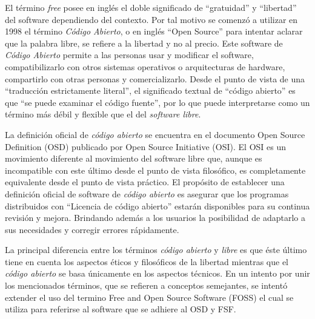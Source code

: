 El término \textit{free} posee en inglés el doble significado
de ``gratuidad'' y ``libertad'' del software dependiendo del
contexto. Por tal motivo se comenzó a utilizar
en 1998 el término \textit{Código Abierto}, o en inglés ``Open
Source'' para intentar aclarar que la palabra libre, se refiere a la libertad y no al precio. Este software de \textit{Código Abierto} permite a las personas usar y modificar el software, compatibilizarlo con otros sistemas operativos o arquitecturas de hardware, compartirlo con otras personas y comercializarlo.
Desde el punto de vista de una ``traducción
estrictamente literal'', el significado textual de ``código abierto''
es que ``se puede examinar el código fuente'', por lo que puede
interpretarse como un término más débil y flexible que el del
\textit{software libre}. 

La definición oficial de \textit{código abierto} se encuentra en el
documento Open Source Definition (OSD) publicado por Open
Source Initiative (OSI). El OSI es un movimiento diferente al
movimiento del software libre que, aunque es incompatible con este
último desde el punto de vista filosófico, es completamente
equivalente desde el punto de vista práctico. El propósito de
establecer una definición oficial de software de \textit{código
  abierto} es asegurar que los programas distribuidos con ``Licencia
de código abierto'' estarán disponibles para su continua revisión y
mejora. Brindando además a los usuarios la posibilidad de adaptarlo a
sus necesidades y corregir errores rápidamente.

La principal diferencia entre los términos \textit{código abierto} y
\textit{libre} es que éste último tiene en cuenta los aspectos éticos
y filosóficos de la libertad mientras que el \textit{código abierto}
se basa únicamente en los aspectos técnicos. En un intento por unir
los mencionados términos, que se refieren a conceptos semejantes, se
intentó extender el uso del termino Free and Open Source Software
(FOSS) el cual se utiliza para referirse al software que se adhiere al
OSD y FSF.


